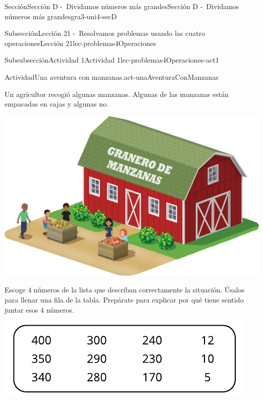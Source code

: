 \begin{sectionptx}{Sección}{Sección D -~Dividamos números más grandes}{}{Sección D -~Dividamos números más grandes}{}{}{gra3-uni4-secD}
%
\begin{subsectionptx}{Subsección}{Lección 21 -~Resolvamos problemas usando las cuatro operaciones}{}{Lección 21}{}{}{lec-problemas4Operaciones}
%
%
\typeout{************************************************}
\typeout{************************************************}
%
\begin{subsubsectionptx}{Subsubsección}{Actividad 1}{}{Actividad 1}{}{}{lec-problemas4Operaciones-act1}
\begin{activity}{Actividad}{Una aventura con manzanas.}{act-unaAventuraConManzanas}%
\begin{sidebyside}{2}{0}{0}{0.1}%
\begin{sbspanel}{0.6}%
Un agricultor recogió algunas manzanas. Algunas de las manzanas están empacadas en cajas y algunas no.%
\end{sbspanel}%
\begin{sbspanel}{0.3}%
\includegraphics[max width=\linewidth, center]{external/png-source/3.4.D21.S_Sp.png}
\end{sbspanel}%
\end{sidebyside}%
\par
Escoge \(4\) números de la lista que describan correctamente la situación. Úsalos para llenar una fila de la tabla. Prepárate para explicar por qué tiene sentido juntar esos \(4\) números.%
\begin{image}{0}{1}{0}{}%
\includegraphics[max width=\linewidth, center]{external/svg-source/tikz-file-149345-scale13.pdf}

\end{image}
\end{activity}
\end{subsubsectionptx}
\end{subsectionptx}
\end{sectionptx}
